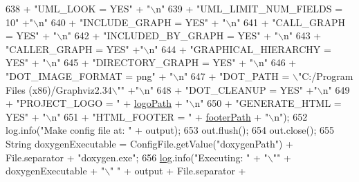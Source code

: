\begin{DoxyCode}
638                     + \textcolor{stringliteral}{"UML\_LOOK = YES"} + \textcolor{stringliteral}{"\(\backslash\)n"}
639                     + \textcolor{stringliteral}{"UML\_LIMIT\_NUM\_FIELDS = 10"} +\textcolor{stringliteral}{"\(\backslash\)n"}
640                     + \textcolor{stringliteral}{"INCLUDE\_GRAPH = YES"} + \textcolor{stringliteral}{"\(\backslash\)n"}
641                     + \textcolor{stringliteral}{"CALL\_GRAPH = YES"} + \textcolor{stringliteral}{"\(\backslash\)n"}
642                     + \textcolor{stringliteral}{"INCLUDED\_BY\_GRAPH = YES"} + \textcolor{stringliteral}{"\(\backslash\)n"}
643                     + \textcolor{stringliteral}{"CALLER\_GRAPH = YES"} +\textcolor{stringliteral}{"\(\backslash\)n"}
644                     + \textcolor{stringliteral}{"GRAPHICAL\_HIERARCHY = YES"} + \textcolor{stringliteral}{"\(\backslash\)n"}
645                     + \textcolor{stringliteral}{"DIRECTORY\_GRAPH = YES"} + \textcolor{stringliteral}{"\(\backslash\)n"}
646                     + \textcolor{stringliteral}{"DOT\_IMAGE\_FORMAT = png"} + \textcolor{stringliteral}{"\(\backslash\)n"}
647                     + \textcolor{stringliteral}{"DOT\_PATH = \(\backslash\)"C:/Program Files (x86)/Graphviz2.34\(\backslash\)""} +\textcolor{stringliteral}{"\(\backslash\)n"}
648                     + \textcolor{stringliteral}{"DOT\_CLEANUP = YES"} +\textcolor{stringliteral}{"\(\backslash\)n"}
649                     + \textcolor{stringliteral}{"PROJECT\_LOGO = "} + \hyperlink{classit_1_1isislab_1_1masonassisteddocumentation_1_1mason_1_1analizer_1_1_global_utility_aeb806bda4a3b7b9099e2197bdca5cd75}{logoPath} + \textcolor{stringliteral}{"\(\backslash\)n"}
650                     + \textcolor{stringliteral}{"GENERATE\_HTML = YES"} + \textcolor{stringliteral}{"\(\backslash\)n"}
651                     + \textcolor{stringliteral}{"HTML\_FOOTER = "} + \hyperlink{classit_1_1isislab_1_1masonassisteddocumentation_1_1mason_1_1analizer_1_1_global_utility_ae94176856fb4ef24dfaa70423f5fc3f9}{footerPath} + \textcolor{stringliteral}{"\(\backslash\)n"});
652             log.info(\textcolor{stringliteral}{"Make config file at: "} + output);
653             out.flush();
654             out.close();
655             String doxygenExecutable = ConfigFile.getValue(\textcolor{stringliteral}{"doxygenPath"}) + File.separator + \textcolor{stringliteral}{"doxygen.exe"};
656             \hyperlink{classit_1_1isislab_1_1masonassisteddocumentation_1_1mason_1_1analizer_1_1_global_utility_afd0c78aa925e69d658bdd0ec85775ced}{log}.info(\textcolor{stringliteral}{"Executing: "} + \textcolor{stringliteral}{"\(\backslash\)""} + doxygenExecutable + \textcolor{stringliteral}{"\(\backslash\)" "} + output + File.separator + 

\end{DoxyCode}
